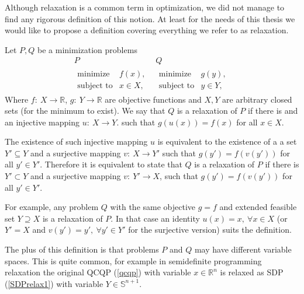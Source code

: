 \documentclass[12pt]{book}
\theoremstyle{definition}
\begin{document}

Although relaxation is a common term in optimization, we did not manage to find any rigorous definition of this notion. At least for the needs of this thesis we would like to propose a definition covering everything we refer to as relaxation.


 Let $P, Q$ be a minimization problems
\label{defRelaxationProposed}
\begin{equation*}
\begin{array}{cc}
 P & Q \\
\begin{array}{ll}
\mbox{minimize} & f(x), \\
\mbox{subject to} & x\in X,
\end{array} 
&
\begin{array}{ll}
\mbox{minimize} & g(y), \\
\mbox{subject to} & y\in Y,
\end{array} 
\end{array}
\end{equation*}
Where $f:\ X\rightarrow \mathbb{R}$, $g:\ Y\rightarrow \mathbb{R}$ are objective functions and $X,Y$ are arbitrary closed sets (for the minimum to exist).
We say that $Q$ is a relaxation of $P$ if there is and an injective mapping $u:\ X\rightarrow Y$. such that $g(u(x)) =  f(x)$ for all $x \in X$.



\rem The existence of such injective mapping $u$ is equivalent to the existence of a a set $Y'\subseteq Y$ and a surjective mapping $v:\ X\rightarrow Y'$ such that  $g(y') = f(v(y'))$ for all $y'\in Y'$. Therefore it is equivalent to state that $Q$ is a relaxation of $P$ if there is $Y'\subset Y$ and a surjective mapping $v:\ Y'\rightarrow X$, such that $g(y') = f(v(y'))$ for all $y'\in Y'$.


For example, any problem $Q$ with the same objective $g=f$ and extended feasible set $Y\supseteq X$ 
is a relaxation of $P$. In that case an identity $u(x) = x, \ \forall x\in X$ (or $Y'=X$ and $v(y') = y',\ \forall y'\in Y'$ for the surjective version) suits the definition. 

The plus of this definition is that problems $P$ and $Q$ may have different variable spaces. This is quite common, for example in semidefinite programming relaxation the original QCQP (\ref{qcqp}) with variable $x\in \mathbb{R}^n$ is relaxed as SDP (\ref{SDPrelax1}) with variable $Y\in\mathbb{S}^{n+1}$. 
 
\end{document}
